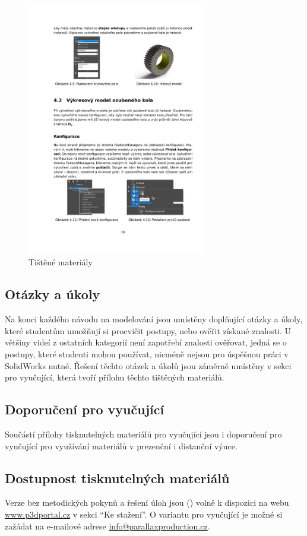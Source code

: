 \begin{figure}[htbp]
\begin{minipage}[b]{0.45\textwidth}
        \includegraphics[width=0.7\textwidth]{img/020/guide2.png}
        \caption{Tištěné materiály}
        \label{fig:auxmat2}
    \end{minipage}
\end{figure}

\subsection{Otázky a úkoly}
Na konci každého návodu na modelování jsou umístěny doplňující otázky a úkoly, které studentům umožňují si procvičit postupy, nebo ověřit získané znalosti.
U většiny videí z ostatních kategorií není zapotřebí znalosti ověřovat, jedná se o postupy, které studenti mohou používat, nicméně nejsou pro úspěšnou práci v SolidWorks nutné.
Řešení těchto otázek a úkolů jsou záměrně umístěny v sekci pro vyučující, která tvoří přílohu těchto tištěných materiálů.

\subsection*{Doporučení pro vyučující}
Součástí přílohy tisknutelných materiálů pro vyučující jsou i doporučení pro vyučující pro využívání materiálů v prezenční i distanční výuce.

\subsection{Dostupnost tisknutelných materiálů}
Verze bez metodických pokynů a řešení úloh jsou (\fxnote[inline=true]{\textcolor{red}{BUDOU}}) volně k dispozici na webu \href{https://www.p3dportal.cz}{www.p3dportal.cz} v sekci \enquote{Ke stažení}.
O variantu pro vyučující je možné si zažádat na e-mailové adrese \href{mailto:info@parallaxproduction.cz}{info@parallaxproduction.cz}.

